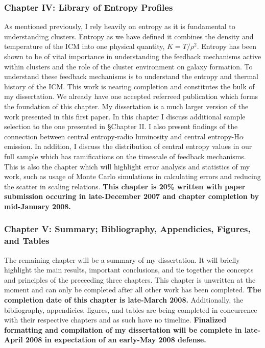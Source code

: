 \documentclass[12pt]{plan}
\begin{document}
\label{sec:ch4}
\subsubsection*{Chapter IV: Library of Entropy Profiles}
As mentioned previously, I rely heavily on entropy as it is 
fundamental to understanding clusters. Entropy as we
have defined it combines the density and temperature of the ICM into one
physical quantity, $K=T/\rho^2$. Entropy has been shown to be of vital
importance in understanding the feedback mechanisms active within
clusters\cite{2001Natur.414..425V} and the role of the cluster
environment on galaxy formation. To understand these feedback
mechanisms is to understand the entropy and thermal history of the
ICM. This work is nearing completion and constitutes the bulk of my
dissertation. We already have one accepted referreed
publication\cite{2006ApJ...643..730D} which forms the foundation of
this chapter. My dissertation is a much larger version of the work
presented in this first paper. In this chapter I discuss additional
sample selection to the one presented in \S Chapter II. I also present
findings of the connection between central entropy-radio luminosity
and central entropy-H$\alpha$ emission. In addition, I discuss the
distribution of central entropy values in our full sample which has
ramifications on the timescale of feedback mechanisms. This is also
the chapter which will highlight error analysis and statistics of my
work, such as usage of Monte Carlo simulations in calculating errors
and reducing the scatter in scaling relations. {\bf This chapter is
20\% written with paper submission occuring in late-December 2007 and
chapter completion by mid-January 2008.}

\label{sec:ch5}
\subsubsection*{Chapter V: Summary; Bibliography, Appendicies, Figures,
and Tables}
The remaining chapter will be a summary of my dissertation. It will
briefly highlight the main results, important conclusions, and tie
together the concepts and principles of the preceeding three
chapters. This chapter is unwritten at the moment and can only
be completed after all other work has been completed. {\bf The
completion date of this chapter is late-March 2008.} Additionally, the
bibliography, appendicies, figures, and tables are being completed
in concurrence with their respective chapters and as such have no
timeline. {\bf Finalized formatting and compilation of my dissertation
will be complete in late-April 2008 in expectation of an early-May
2008 defense.}
\end{document}

